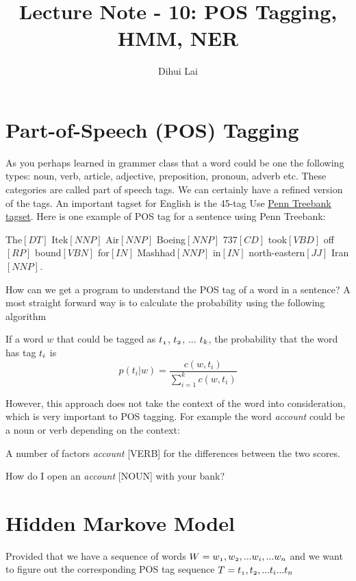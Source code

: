 \documentclass[12pt, oneside]{article}
\title{Lecture Note - 10: POS Tagging, HMM, NER}
\author{Dihui Lai}
\begin{document}
\maketitle
\tableofcontents

\vspace{.25in}

\section{Part-of-Speech (POS) Tagging}
As you perhaps learned in grammer class that a word could be one the following types: noun, verb, article, adjective, preposition, pronoun, adverb etc. These categories are called part of speech tags. We can certainly have a refined version of the tags. An important tagset for English is the 45-tag Use \href{https://www.ling.upenn.edu/courses/Fall_2003/ling001/penn_treebank_pos.html}{\underline{Penn Treebank tagset}}. Here is one example of POS tag for a sentence using Penn Treebank:

The$[DT]$ Itek$[NNP]$ Air$[NNP]$ Boeing$[NNP]$ 737$[CD]$ took$[VBD]$ off$[RP]$ bound$[VBN]$ for$[IN]$ Mashhad$[NNP]$ in$[IN]$ north-eastern$[JJ]$ Iran$[NNP]$.

How can we get a program to understand the POS tag of a word in a sentence? A most straight forward way is to calculate the probability using the following algorithm

If a word $w$ that could be tagged as $\mathnormal{t_1}$, $\mathnormal{t_2}$, ... $\mathnormal{t_k}$, the probability that the word has tag $\mathnormal{t_i}$ is
\begin{equation*}
{p(t_i|w) = \frac{c(w,t_i)}{\sum\limits_{i=1}^{k}c(w, t_i)}}
\end{equation*}

However, this approach does not take the context of the word into consideration, which is very important to POS tagging. For example the word \textit{account} could be a noun or verb depending on the context: 

A number of factors \textit{account} [VERB] for the differences between the two scores.

How do I open an \textit{account} [NOUN] with your bank?


\section{Hidden Markove Model}

Provided that we have a sequence of words $\mathnormal{W=w_1, w_2,  ...w_i, ...w_n}$ and we want to figure out the corresponding POS tag sequence $\mathnormal{T= t_1, t_2, ... t_i ...t_n}$
\end{document}
